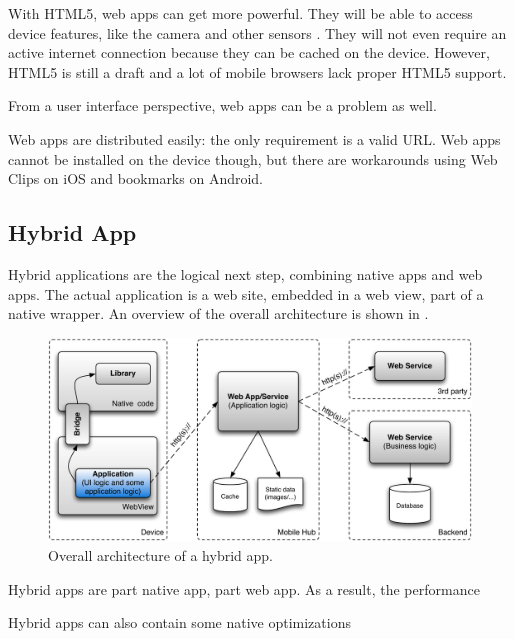 \npar With HTML5, web apps can get more powerful. They will be able to access device features, like the camera and other sensors \citep{MobileHTML5}. They will not even require an active internet connection because they can be cached on the device. However, HTML5 is still a draft and a lot of mobile browsers lack proper HTML5 support.

\npar From a user interface perspective, web apps can be a problem as well. %

\npar Web apps are distributed easily: the only requirement is a valid URL. Web apps cannot be installed on the device though, but there are workarounds using Web Clips on iOS \citep{Safari:webclips} and bookmarks on Android. 

\subsection{Hybrid App}

\npar Hybrid applications are the logical next step, combining native apps and web apps. The actual application is a web site, embedded in a web view, part of a native wrapper. An overview of the overall architecture is shown in . 

\begin{figure}[h!]
    \begin{center}
        \includegraphics[width=\textwidth]{figs/hybrid.pdf}
        \caption{
            Overall architecture of a hybrid app.
        }
        \label{fig:hybrid}
    \end{center}
\end{figure}

\npar Hybrid apps are part native app, part web app. As a result, the performance 

Hybrid apps can also contain some native optimizations

\npar 

